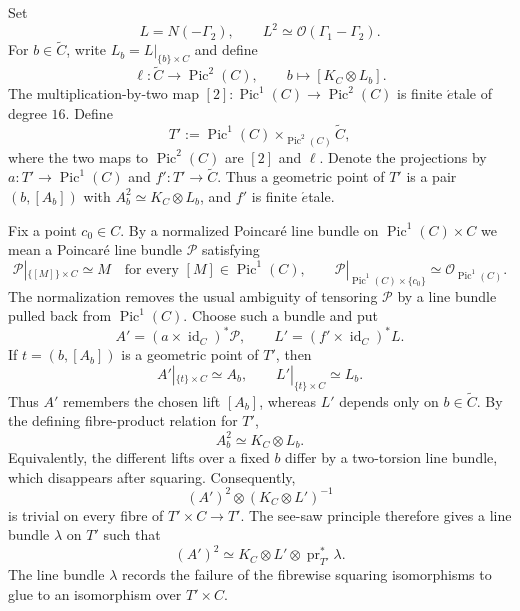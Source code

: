 \documentclass[11pt,a4paper,dvipsnames]{amsart}
\numberwithin{equation}{section}
\theoremstyle{plain}
\theoremstyle{definition}
\newcommand{\cO}{\mathcal O}
\newcommand{\Pic}{\operatorname{Pic}}
\newcommand{\id}{\operatorname{id}}
\begin{document}
Set
\begin{equation}\label{eq:L}
 L=N(-\Gamma_2),
 \qquad
 L^2\simeq\cO(\Gamma_1-\Gamma_2).
\end{equation}
For $b\in\widetilde C$, write $L_b=L|_{\{b\}\times C}$ and define
\begin{equation}\label{eq:ell-map}
 \ell:\widetilde C\longrightarrow\Pic^2(C),
 \qquad
 b\longmapsto[K_C\otimes L_b].
\end{equation}
The multiplication-by-two map
$[2]:\Pic^1(C)\to\Pic^2(C)$ is finite $\acute{e}$tale of degree $16$.
Define
\begin{equation}\label{eq:T-prime}
 T':=\Pic^1(C)\mathop{\times}_{\Pic^2(C)}\widetilde C,
\end{equation}
where the two maps to $\Pic^2(C)$ are $[2]$ and $\ell$.  Denote the
projections by $a:T'\to\Pic^1(C)$ and $f':T'\to\widetilde C$.  Thus a
geometric point of $T'$ is a pair $(b,[A_b])$ with
$A_b^2\simeq K_C\otimes L_b$, and $f'$ is finite $\acute{e}$tale.


Fix a point $c_0\in C$.  By a normalized Poincar\'e line bundle on
$\Pic^1(C)\times C$ we mean a Poincar\'e line bundle $\mathscr P$
satisfying
$$
 \mathscr P|_{\{[M]\}\times C}\simeq M
 \quad\text{for every }[M]\in\Pic^1(C),
 \qquad
 \mathscr P|_{\Pic^1(C)\times\{c_0\}}
 \simeq\cO_{\Pic^1(C)}.
$$
The normalization removes the usual ambiguity of tensoring $\mathscr P$
by a line bundle pulled back from $\Pic^1(C)$.  Choose such a bundle and
put
$$
 A'=(a\times\id_C)^*\mathscr P,
 \qquad
 L'=(f'\times\id_C)^*L.
$$
If $t=(b,[A_b])$ is a geometric point of $T'$, then
$$
 A'|_{\{t\}\times C}\simeq A_b,
 \qquad
 L'|_{\{t\}\times C}\simeq L_b.
$$
Thus $A'$ remembers the chosen lift $[A_b]$, whereas $L'$ depends
only on $b \in \widetilde C$.  By the defining fibre-product relation for $T'$,
$$
 A_b^2\simeq K_C\otimes L_b.
$$
Equivalently, the different lifts over a fixed $b$ differ by a
two-torsion line bundle, which disappears after squaring.  Consequently,
$$
 (A')^2\otimes(K_C\otimes L')^{-1}
$$
is trivial on every fibre of $T'\times C\to T'$.  The see-saw principle
therefore gives a line bundle $\lambda$ on $T'$ such that
\begin{equation}\label{eq:base-twist}
 (A')^2\simeq
 K_C\otimes L'\otimes\operatorname{pr}_{T'}^*\lambda.
\end{equation}
The line bundle $\lambda$ records the failure of the fibrewise squaring
isomorphisms to glue to an isomorphism over $T'\times C$.
\end{document}
